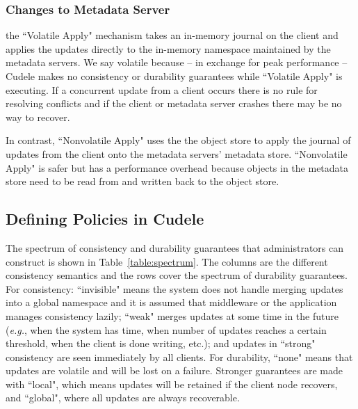 \subsubsection{Changes to Metadata Server} the ``Volatile Apply" mechanism
takes an in-memory journal on the client and applies the updates directly to
the in-memory namespace maintained by the metadata servers. We say volatile
because -- in exchange for peak performance -- Cudele makes no consistency or
durability guarantees while ``Volatile Apply" is executing.  If a concurrent
update from a client occurs there is no rule for resolving conflicts and if the
client or metadata server crashes there may be no way to recover.

In contrast, ``Nonvolatile Apply" uses the the object store to apply the
journal of updates from the client onto the metadata servers' metadata store.
``Nonvolatile Apply" is safer but has a performance overhead because objects in
the metadata store need to be read from and written back to the object store.


\subsection{Defining Policies in Cudele}
\label{sec:setting-policies-with-cudele}

The spectrum of consistency and durability guarantees that administrators can
construct is shown in Table~\ref{table:spectrum}. The columns are the different
consistency semantics and the rows cover the spectrum of durability guarantees.
For consistency: ``invisible" means the system does not handle merging updates
into a global namespace and it is assumed that middleware or the application
manages consistency lazily; ``weak" merges updates at some time in the
future ({\it e.g.}, when the system has time, when number of updates reaches a
certain threshold, when the client is done writing, etc.); and updates in
``strong" consistency are seen immediately by all clients. For durability,
``none" means that updates are volatile and will be lost on a failure. Stronger
guarantees are made with ``local", which means updates will be retained if the
client node recovers, and ``global", where all updates are always recoverable.

